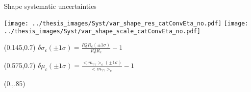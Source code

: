 \documentclass[10pt,UKenglish, leqno, xcolor = dvipsnames]{beamer}
\begin{document}
		\begin{frame}{Shape systematic uncertainties}
			\vfill
			\begin{center}
				\texttt{[image: ../thesis\_images/Syst/var\_shape\_res\_catConvEta\_no.pdf]}
				\texttt{[image: ../thesis\_images/Syst/var\_shape\_scale\_catConvEta\_no.pdf]}
			\end{center}
			\vfill
			\begin{textblock}{}(0.145,0.7)
				\small
				$\delta\sigma_c(\pm1\sigma)=\frac{IQR_c(\pm1\sigma)}{IQR_c}-1$
			\end{textblock}
			\begin{textblock}{}(0.575,0.7)
				\small
				$\delta\mu_c(\pm1\sigma)=\frac{<m_{\gamma\gamma}>_c(\pm1\sigma)}{<m_{\gamma\gamma}>_c}-1$
			\end{textblock}
			\begin{textblock}{1}(0.,.85)
				\begin{figure}
				\end{figure}
			\end{textblock}
		\end{frame}
	
\end{document}
